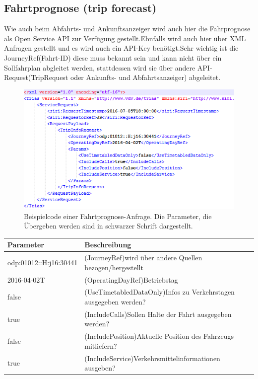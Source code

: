 \documentclass[a4paper,12pt]{scrartcl}
\begin{document}
\subsection{Fahrtprognose (trip forecast)}%
\label{sec:Fahrtprognose}
Wie auch beim Abfahrts- und Ankunftsanzeiger wird auch hier die Fahrprognose als Open Service API zur Verfügung gestellt.Ebnfalls wird auch hier über XML Anfragen gestellt und es wird auch ein API-Key benötigt.Sehr wichtig ist die JourneyRef(Fahrt-ID) diese muss bekannt sein und kann nicht über ein Sollfahrplan abgleitet werden, stattdessen wird sie über andere API-Request(TripRequest oder Ankunfts- und Abfahrtsanzeiger) abgeleitet.\cite{fahrtprognose}

\begin{figure}[]
	\centering
	\includegraphics[width=12cm]{img/bspAbfrageFahrprognose.png}
	\caption{Beispielcode einer Fahrtprognose-Anfrage. Die Parameter, die Übergeben werden sind in schwarzer Schrift dargestellt.\cite{fahrtprognose}}
	\label{fig:Beispiel Anfrage Fahrtprognose}
\end{figure}

\begin{tabular}{|l|l|}  \hline
	Parameter & Beschreibung \\ \hline
	odp:01012::H:j16:30441& (JourneyRef)wird über andere Quellen bezogen/hergestellt   \\ \hline
	2016-04-02T & (OperatingDayRef)Betriebstag \\ \hline
	false & (UseTimetabledDataOnly)Infos zu Verkehrstagen ausgegeben werden? \\ \hline
	true & (IncludeCalls)Sollen Halte der Fahrt ausgegeben werden?   \\ \hline
	false & (IncludePosition)Aktuelle Position des Fahrzeugs mitliefern? \\ \hline	
	true & (IncludeService)Verkehrsmittelinformationen ausgeben? \\ \hline
\end{tabular}
\end{document}
